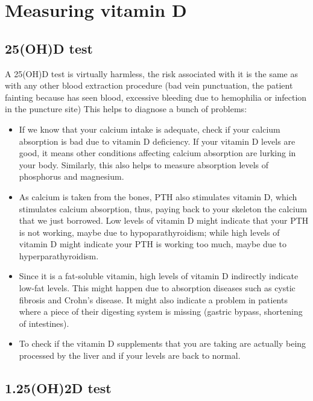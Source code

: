 \section{Measuring vitamin D}

\subsection{25(OH)D test}

A 25(OH)D test is virtually harmless, the risk associated with it is the same as with any other blood extraction procedure (bad vein punctuation, the patient fainting because has seen blood, excessive bleeding due to hemophilia or infection in the puncture site) This helps to diagnose a bunch of problems:

\begin{itemize}

    \item If we know that your calcium intake is adequate, check if your calcium absorption is bad due to vitamin D deficiency. If your vitamin D levels are good, it means other conditions affecting calcium absorption are lurking in your body. Similarly, this also helps to measure absorption levels of phosphorus and magnesium.
    
    \item As calcium is taken from the bones, PTH also stimulates vitamin D, which stimulates calcium absorption, thus, paying back to your skeleton the calcium that we just borrowed. Low levels of vitamin D might indicate that your PTH is not working, maybe due to hypoparathyroidism; while high levels of vitamin D might indicate your PTH is working too much, maybe due to hyperparathyroidism.
    
    \item Since it is a fat-soluble vitamin, high levels of vitamin D indirectly indicate low-fat levels. This might happen due to absorption diseases such as cystic fibrosis and Crohn’s disease. It might also indicate a problem in patients where a piece of their digesting system is missing (gastric bypass, shortening of intestines).
    
    \item  To check if the vitamin D supplements that you are taking are actually being processed by the liver and if your levels are back to normal.
    
\end{itemize}



\subsection{1.25(OH)2D test}

